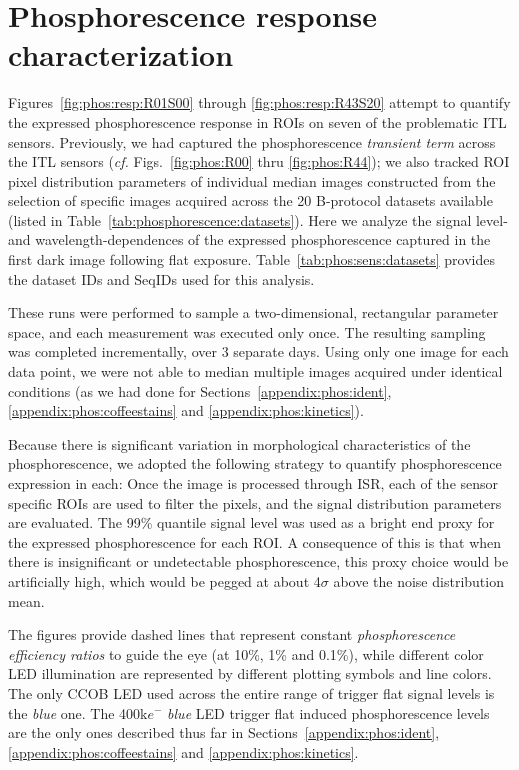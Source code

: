\section{Phosphorescence response characterization}
\label{appendix:phos:response}

Figures~\ref{fig:phos:resp:R01S00} through \ref{fig:phos:resp:R43S20} attempt to quantify the expressed phosphorescence response in ROIs on seven of the problematic ITL sensors. Previously, we had captured the phosphorescence {\it transient term} across the ITL sensors ({\it cf.} Figs.~\ref{fig:phos:R00} thru \ref{fig:phos:R44}); we also tracked ROI pixel distribution parameters of individual median images constructed from the selection of specific images acquired across the 20 B-protocol datasets available (listed in Table~\ref{tab:phosphorescence:datasets}). Here we analyze the signal level- and wavelength-dependences of the expressed phosphorescence captured in the first dark image following flat exposure. Table~\ref{tab:phos:sens:datasets} provides the dataset IDs and SeqIDs used for this analysis. 



These runs were performed to sample a two-dimensional, rectangular parameter space, and each measurement was executed only once. The resulting sampling was completed incrementally, over 3 separate days. Using only one image for each data point, we were not able to median multiple images acquired under identical conditions (as we had done for Sections~\ref{appendix:phos:ident}, \ref{appendix:phos:coffeestains} and \ref{appendix:phos:kinetics}). 

Because there is significant variation in morphological characteristics of the phosphorescence, we adopted the following strategy to quantify phosphorescence expression in each: Once the image is processed through ISR, each of the sensor specific ROIs are used to filter the pixels, and the signal distribution parameters are evaluated. The 99\% quantile signal level was used as a bright end proxy for the expressed phosphorescence for each ROI. A consequence of this is that when there is insignificant or undetectable phosphorescence, this proxy choice would be artificially high, which would be pegged at about 4$\sigma$ above the noise distribution mean. 

The figures provide dashed lines that represent constant {\it phosphorescence efficiency ratios} to guide the eye (at 10\%, 1\% and 0.1\%), while different color LED illumination are represented by different plotting symbols and line colors. The only CCOB LED used across the entire range of trigger flat signal levels is the {\it blue} one. The 400k$e^-$ {\it blue} LED trigger flat induced phosphorescence levels are the only ones described thus far in Sections~\ref{appendix:phos:ident}, \ref{appendix:phos:coffeestains} and \ref{appendix:phos:kinetics}.  

